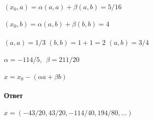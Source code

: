 \documentclass{article}
\begin{document}
		$(x_0, a)=\alpha(a,a)+\beta(a,b)=5/16$\\ \\
		$(x_0, b)=\alpha(a,b)+\beta(b,b)=4$\\ \\
		$(a,a)=1/3   $
		$(b,b)=1+1=2   $
		$(a,b)=3/4$\\ \\
		$\alpha=-114/5,\ \ \beta=211/20$\\ \\
		$x = x_0 - (\alpha a+\beta b)$\\ \\
		\textbf{Ответ}\\ \\
		$x=(-43/20,43/20,-114/40,194/80,\dots)$	
\end{document}
